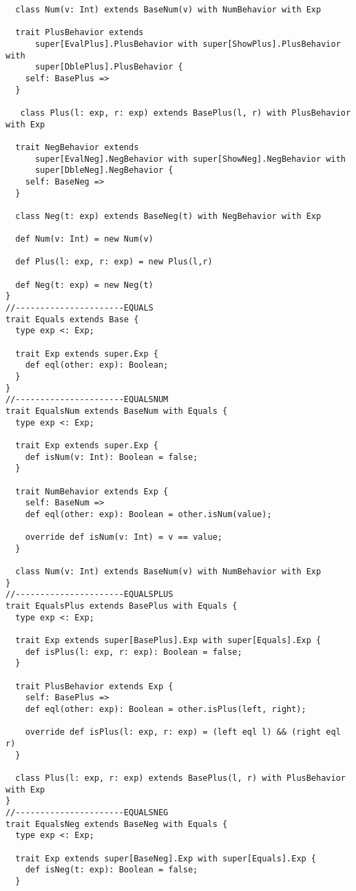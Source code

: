 \begin{lstlisting}
  class Num(v: Int) extends BaseNum(v) with NumBehavior with Exp

  trait PlusBehavior extends
      super[EvalPlus].PlusBehavior with super[ShowPlus].PlusBehavior with
      super[DblePlus].PlusBehavior {
    self: BasePlus =>
  }

   class Plus(l: exp, r: exp) extends BasePlus(l, r) with PlusBehavior with Exp

  trait NegBehavior extends
      super[EvalNeg].NegBehavior with super[ShowNeg].NegBehavior with
      super[DbleNeg].NegBehavior {
    self: BaseNeg =>
  }

  class Neg(t: exp) extends BaseNeg(t) with NegBehavior with Exp
  
  def Num(v: Int) = new Num(v)
  
  def Plus(l: exp, r: exp) = new Plus(l,r)

  def Neg(t: exp) = new Neg(t)
}
//----------------------EQUALS
trait Equals extends Base {
  type exp <: Exp;

  trait Exp extends super.Exp {
    def eql(other: exp): Boolean;
  }
}
//----------------------EQUALSNUM
trait EqualsNum extends BaseNum with Equals {
  type exp <: Exp;

  trait Exp extends super.Exp {
    def isNum(v: Int): Boolean = false;
  }

  trait NumBehavior extends Exp {
    self: BaseNum =>
    def eql(other: exp): Boolean = other.isNum(value);

    override def isNum(v: Int) = v == value;
  }

  class Num(v: Int) extends BaseNum(v) with NumBehavior with Exp
}
//----------------------EQUALSPLUS
trait EqualsPlus extends BasePlus with Equals {
  type exp <: Exp;

  trait Exp extends super[BasePlus].Exp with super[Equals].Exp {
    def isPlus(l: exp, r: exp): Boolean = false;
  }

  trait PlusBehavior extends Exp {
    self: BasePlus =>
    def eql(other: exp): Boolean = other.isPlus(left, right);

    override def isPlus(l: exp, r: exp) = (left eql l) && (right eql r)
  }

  class Plus(l: exp, r: exp) extends BasePlus(l, r) with PlusBehavior with Exp
}
//----------------------EQUALSNEG
trait EqualsNeg extends BaseNeg with Equals {
  type exp <: Exp;

  trait Exp extends super[BaseNeg].Exp with super[Equals].Exp {
    def isNeg(t: exp): Boolean = false;
  }


\end{lstlisting}

